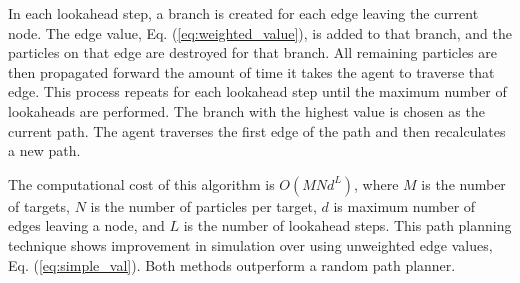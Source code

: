\documentclass[letterpaper, 10 pt, conference]{ieeeconf}  %
\begin{document}
In each lookahead step, a branch is created for each edge leaving the current node. The edge value, Eq. (\ref{eq:weighted_value}), is added to that branch, and the particles on that edge are destroyed for that branch. All remaining particles are then propagated forward the amount of time it takes the agent to traverse that edge. This process repeats for each lookahead step until the maximum number of lookaheads are performed. The branch with the highest value is chosen as the current path. The agent traverses the first edge of the path and then recalculates a new path.




The computational cost of this algorithm is $O(MNd^L)$, where $M$ is the number of targets, $N$ is the number of particles per target, $d$ is maximum number of edges leaving a node, and $L$ is the number of lookahead steps. This path planning technique shows improvement in simulation over using unweighted edge values, Eq. (\ref{eq:simple_val}). Both methods outperform a random path planner.
\end{document}
